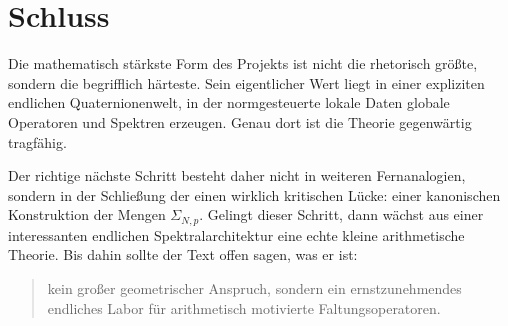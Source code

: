 \documentclass[12pt,a4paper]{article}
\theoremstyle{plain}
\theoremstyle{definition}
\theoremstyle{remark}
\begin{document}
	\section{Schluss}
	Die mathematisch stärkste Form des Projekts ist nicht die rhetorisch größte, sondern die begrifflich härteste. Sein eigentlicher Wert liegt in einer expliziten endlichen Quaternionenwelt, in der normgesteuerte lokale Daten globale Operatoren und Spektren erzeugen. Genau dort ist die Theorie gegenwärtig tragfähig.
	
	Der richtige nächste Schritt besteht daher nicht in weiteren Fernanalogien, sondern in der Schließung der einen wirklich kritischen Lücke: einer kanonischen Konstruktion der Mengen $\Sigma_{N,p}$. Gelingt dieser Schritt, dann wächst aus einer interessanten endlichen Spektralarchitektur eine echte kleine arithmetische Theorie. Bis dahin sollte der Text offen sagen, was er ist:
	\begin{quote}
		kein großer geometrischer Anspruch, sondern ein ernstzunehmendes endliches Labor für arithmetisch motivierte Faltungsoperatoren.
	\end{quote}
	
\end{document}
